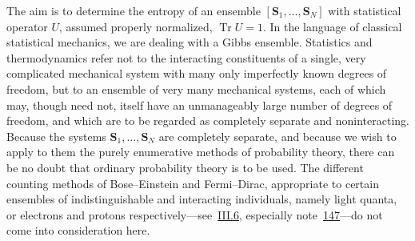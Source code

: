 \documentclass[fontsize=13pt,twoside,openany,headings=normal,parskip=false,bookmarkpackage=false,DIV=calc]{scrbook}
\begin{document}
The aim is to determine the entropy of an ensemble $[\boldsymbol{S}_1,\ldots,\boldsymbol{S}_N]$ with statistical operator $U$, assumed properly normalized, $\operatorname{Tr}U=1$. In the language of classical statistical mechanics, we are dealing with a Gibbs ensemble. Statistics and thermodynamics refer not to the interacting constituents of a single, very complicated mechanical system with many only imperfectly known degrees of freedom, but to an ensemble of very many mechanical systems, each of which may, though need not, itself have an unmanageably large number of degrees of freedom, and which are to be regarded as completely separate and noninteracting. Because the systems $\boldsymbol{S}_1,\ldots,\boldsymbol{S}_N$ are completely separate, and because we wish to apply to them the purely enumerative methods of probability theory, there can be no doubt that ordinary probability theory is to be used. The different counting methods of Bose--Einstein and Fermi--Dirac, appropriate to certain ensembles of indistinguishable and interacting individuals, namely light quanta, or electrons and protons respectively---see~\hyperref[sec:III.6]{III.6}, especially note~\hyperlink{note-147}{147}---do not come into consideration here.
\end{document}
